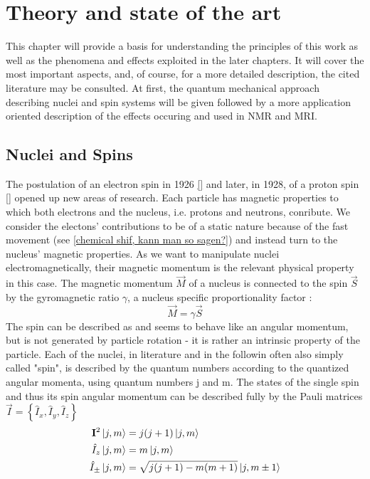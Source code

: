 \chapter{Theory and state of the art}\label{chap:theory}
This chapter will provide a basis for understanding the principles of this work as well as the phenomena and effects exploited in the later chapters. It will cover the most important aspects, and, of course, for a more detailed description, the cited literature may be consulted. At first, the quantum mechanical approach describing nuclei and spin systems will be given followed by a more application oriented description of the effects occuring and used in NMR and MRI.
    \section{Nuclei and Spins}
        \label{theory:section:nucleiSpins}
        The postulation of an electron spin in 1926 \ref{} and later, in 1928, of a proton spin \ref{} opened
        up new areas of research.
        Each particle has magnetic properties to which both electrons and the nucleus, i.e. protons and neutrons, conribute. We consider the electons' contributions to be of a static nature because of the fast movement (see \ref{chemical shif, kann man so sagen?}) and instead turn to the nucleus' magnetic properties. As we want to manipulate nuclei electromagnetically, their magnetic momentum is the relevant physical property in this case.
        The magnetic momentum $\vec M$ of a nucleus is connected to the spin $\vec S$ by the gyromagnetic ratio $\gamma$, a nucleus specific proportionality factor \cite{balanis_advanced_nodate}:
        \begin{equation}
            \vec M = \gamma \vec S
            \label{eq:gyromagneticRatio}
        \end{equation}
        The spin can be described as and seems to behave like an angular momentum, but is not generated by particle rotation - it is rather an intrinsic property of the particle. Each of the nuclei, in literature and in the followin often also simply called "spin", is described by the quantum numbers according to the quantized angular momenta, using quantum numbers j and m.
        The states of the single spin and thus its spin angular momentum can be described fully by the Pauli matrices $\vec{I} = \left\{ \hat{I}_x, \hat{I}_y, \hat{I}_z\right\}$\cite{pauli_zur_1988}
            \begin{align}
                \label{equ:theory:spinStates}
                \mathbf{I}^2 \ket{j,m} &= j(j+1)\ket{j,m}\\
                \hat{I}_z \ket{j,m} &= m\ket{j,m}\\
                \hat{I}_\pm \ket{j,m} &= \sqrt{j(j+1)-m(m+1)}\ket{j,m\pm1}
            \end{align}

